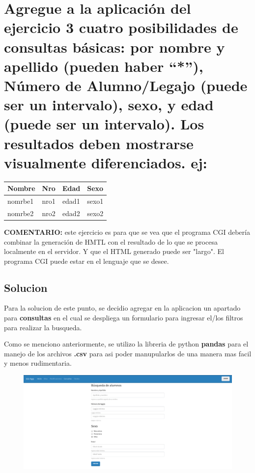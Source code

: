 \documentclass[12pt]{extarticle}
\makeatletter
\def\maxwidth{\ifdim\Gin@nat@width>\linewidth\linewidth
    \else\Gin@nat@width\fi}
\let\Oldincludegraphics\includegraphics
\renewcommand{\includegraphics}[1]{\Oldincludegraphics[width=.8\maxwidth]{#1}}
\makeatother
\begin{document}
    \section{Agregue a la aplicación del ejercicio 3 cuatro posibilidades de
consultas básicas: por nombre y apellido (pueden haber ``*''), Número de
Alumno/Legajo (puede ser un intervalo), sexo, y edad (puede ser un
intervalo). Los resultados deben mostrarse visualmente diferenciados.
ej:}\label{agregue-a-la-aplicaciuxf3n-del-ejercicio-3-cuatro-posibilidades-de-consultas-buxe1sicas-por-nombre-y-apellido-pueden-haber-nuxfamero-de-alumnolegajo-puede-ser-un-intervalo-sexo-y-edad-puede-ser-un-intervalo.-los-resultados-deben-mostrarse-visualmente-diferenciados.-ej}

\begin{longtable}[]{@{}llll@{}}
\toprule
Nombre & Nro & Edad & Sexo\tabularnewline
\midrule
\endhead
nomrbe1 & nro1 & edad1 & sexo1\tabularnewline
nomrbe2 & nro2 & edad2 & sexo2\tabularnewline
\bottomrule
\end{longtable}

\textbf{COMENTARIO:} este ejercicio es para que se vea que el programa
CGI debería combinar la generación de HMTL con el resultado de lo que se
procesa localmente en el servidor. Y que el HTML generado puede ser
"largo". El programa CGI puede estar en el lenguaje que se desee.

    \subsection{Solucion}\label{solucion}

Para la solucion de este punto, se decidio agregar en la aplicacion un
apartado para \textbf{consultas} en el cual se despliega un formulario
para ingresar el/los filtros para realizar la busqueda.

Como se menciono anteriormente, se utilizo la libreria de python
\textbf{pandas} para el manejo de los archivos \textbf{.csv} para asi
poder manupularlos de una manera mas facil y menos rudimentaria.

\begin{figure}[h]
\centering
\includegraphics{images/consultas.png}
\caption{}
\end{figure}
\end{document}
